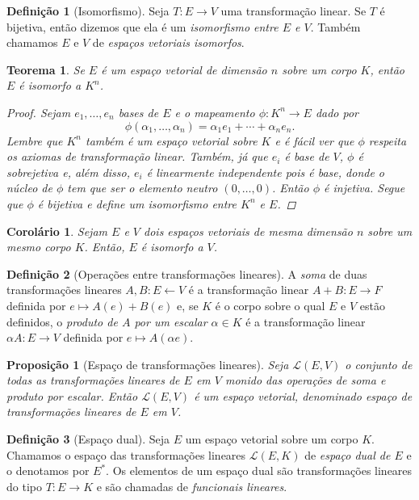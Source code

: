 \documentclass[a4paper,12pt]{report}
\theoremstyle{plain}
\newtheorem{teorema}{Teorema}[section]
\newtheorem{proposicao}{Proposição}[section]
\newtheorem{corolario}{Corolário}[section]
\theoremstyle{definition}
\newtheorem{definicao}{Definição}[section]
\begin{document}
	\begin{definicao}[Isomorfismo]
		Seja $T:E\longrightarrow V$ uma transformação linear. Se $T$ é bijetiva, então dizemos que ela é um \emph{isomorfismo entre $E$ e $V$}. Também chamamos $E$ e $V$ de \emph{espaços vetoriais isomorfos}.
	\end{definicao}

	\begin{teorema}
		Se $E$ é um espaço vetorial de dimensão $n$ sobre um corpo $K$, então $E$ é isomorfo a $K^n$.
		\begin{proof}
			Sejam $e_1,\dots,e_n$ bases de $E$ e o mapeamento $\phi: K^n\longrightarrow E$ dado por $$\phi(\alpha_1,\dots,\alpha_n) = \alpha_1e_1+\cdots+\alpha_ne_n.$$
			Lembre que $K^n$ também é um espaço vetorial sobre $K$ e é fácil ver que $\phi$ respeita os axiomas de transformação linear. Também, já que $e_i$ é base de $V$, $\phi$ é sobrejetiva e, além disso, $e_i$ é linearmente independente pois é base, donde o núcleo de $\phi$ tem que ser o elemento neutro $(0,\dots,0)$. Então $\phi$ é injetiva. Segue que $\phi$ é bijetiva e define um isomorfismo entre $K^n$ e $E$.
		\end{proof}
	\end{teorema}

	\begin{corolario}
		Sejam $E$ e $V$ dois espaços vetoriais de mesma dimensão $n$ sobre um mesmo corpo $K$. Então, $E$ é isomorfo a $V$.
	\end{corolario}

	\begin{definicao}[Operações entre transformações lineares]
		A \emph{soma} de duas transformações lineares $A,B : E\longleftarrow V$ é a transformação linear $A+B: E\longrightarrow F$ definida por $e\mapsto A(e)+B(e)$ e, se $K$ é o corpo sobre o qual $E$ e $V$ estão definidos, o \emph{produto de $A$ por um escalar $\alpha\in K$} é a transformação linear $\alpha A: E\longrightarrow V$ definida por $e\mapsto A(\alpha e)$.
	\end{definicao}

	\begin{proposicao}[Espaço de transformações lineares]
		Seja $\mathcal L(E,V)$ o conjunto de todas as transformações lineares de $E$ em $V$ monido das operações de soma e produto por escalar. Então $\mathcal L(E,V)$ é um espaço vetorial, denominado \emph{espaço de transformações lineares de $E$ em $V$}.
	\end{proposicao}

	\begin{definicao}[Espaço dual]
		Seja $E$ um espaço vetorial sobre um corpo $K$. Chamamos o espaço das transformações lineares $\mathcal L(E,K)$ de \emph{espaço dual de $E$} e o denotamos por $E^*$. Os elementos de um espaço dual são transformações lineares do tipo $T:E\longrightarrow K$ e são chamadas de \emph{funcionais lineares}.
	\end{definicao}
	
\end{document}
